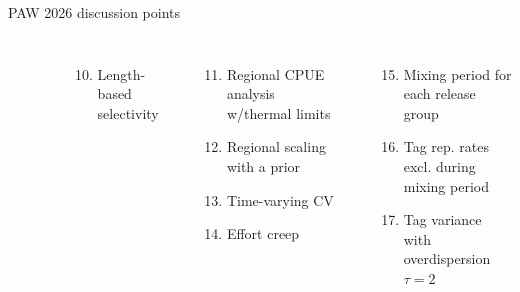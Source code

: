 \documentclass[aspectratio=169]{beamer}
\begin{document}
\begin{frame}{PAW 2026 discussion points}
\begin{columns}[T]
\begin{enumerate}
    \end{enumerate}
    \\[-0.8ex]
    \begin{enumerate}\setcounter{enumi}{9}\setlength\itemsep{-0.1ex}
      \item Length-based selectivity\\[1.4ex]
    \end{enumerate}
    \\[-0.8ex]
    \begin{enumerate}\setcounter{enumi}{10}\setlength\itemsep{-0.1ex}
      \item Regional CPUE analysis w/thermal limits
      \item Regional scaling with a prior
      \item Time-varying CV
      \item Effort creep
    \end{enumerate}
    \\[-0.8ex]
    \begin{enumerate}\setcounter{enumi}{14}\setlength\itemsep{-0.1ex}
      \item Mixing period for each release group
      \white \item[{\white\bf +}] Tag rep. rates excl. during mixing period
      \white \item[{\white\bf +}] Tag variance with overdispersion
      $\tau\!=\!2$\\[1.4ex]
    \end{enumerate}
  \end{columns}
\end{frame}

\end{document}
